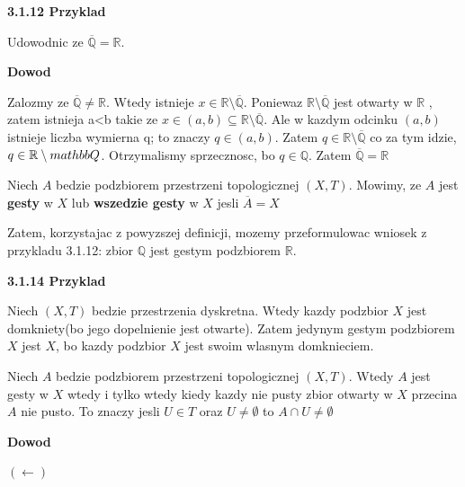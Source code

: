 \documentclass{article}
\begin{document}
\textbf{3.1.12 Przyklad}

Udowodnic ze $\overline{\mathbb{Q}} = \mathbb{R}$.

\textbf{Dowod}

Zalozmy ze $\overline{\mathbb{Q}} \neq \mathbb{R}$. Wtedy istnieje $x \in \mathbb{R} \setminus \overline{\mathbb{Q}}$. Poniewaz $\mathbb{R} \setminus \overline{\mathbb{Q}}$ jest otwarty w $\mathbb{R}$ , zatem istnieja a<b takie ze $x\in (a,b) \subseteq \mathbb{R}\setminus \overline{\mathbb{Q}}$. Ale w kazdym odcinku $(a,b)$
istnieje liczba wymierna q; to znaczy $q \in (a,b)$. Zatem $q \in \mathbb{R} \setminus \overline{\mathbb{Q}}$ co za tym idzie, $q\in \mathbb{R}\setminus \\mathbb{Q}$. Otrzymalismy sprzecznosc, bo $q \in \mathbb{Q}$. Zatem $\overline{\mathbb{Q}} = \mathbb{R}$

\begin{tcolorbox}[colback=white!90!red,colframe=black!35!red,title=3.1.13 Definicja: Gestosc]

    Niech $A$ bedzie podzbiorem przestrzeni topologicznej $(X,T)$. Mowimy, ze $A$ jest \textbf{gesty} w $X$ lub \textbf{wszedzie gesty} w $X$ jesli $\overline{A} = X$

\end{tcolorbox}

Zatem, korzystajac z powyzszej definicji, mozemy przeformulowac wniosek z przykladu 3.1.12: zbior $\mathbb{Q}$ jest gestym podzbiorem $\mathbb{R}$.

\textbf{3.1.14 Przyklad}

Niech $(X,T)$ bedzie przestrzenia dyskretna. Wtedy kazdy podzbior $X$ jest domkniety(bo jego dopelnienie jest otwarte). Zatem jedynym gestym podzbiorem $X$ jest $X$, bo kazdy podzbior $X$ jest swoim wlasnym domknieciem.


\begin{tcolorbox}[colback=white!90!green,colframe=black!35!green,title=3.1.15 Lematokomentarz: Gesty zbior A przecina niepusto wszystkie zbiory otwarte]

Niech $A$ bedzie podzbiorem przestrzeni topologicznej $(X,T)$. Wtedy $A$ jest gesty w $X$ wtedy i tylko wtedy kiedy kazdy nie pusty zbior otwarty w $X$ przecina $A$ nie pusto. To znaczy jesli $U \in T$ oraz $U \neq \emptyset$ to $A \cap U \neq \emptyset$

\end{tcolorbox}

\textbf{Dowod}

$(\leftarrow)$
\end{document}
